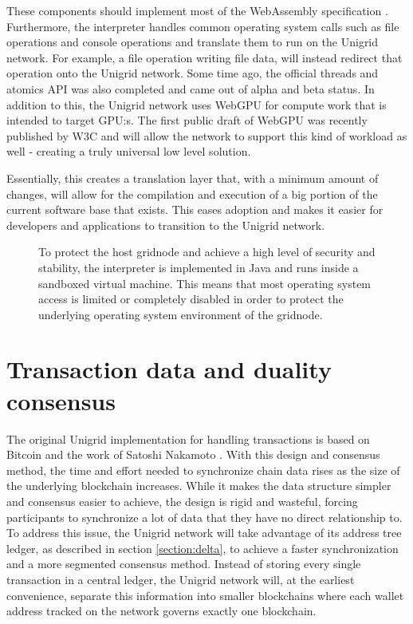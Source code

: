 \documentclass[10pt,a4paper,final]{article}
\begin{document}
These components should implement most of the WebAssembly specification \cite{webassembly}. Furthermore, the interpreter handles common operating system calls such as file operations and console operations and translate them to run on the Unigrid network. For example, a file operation writing file data, will instead redirect that operation onto the Unigrid network. Some time  ago, the official threads and atomics API \cite{webassemblythreads} was also completed and came out of alpha and beta status. In addition to this, the Unigrid network uses WebGPU for compute work that is intended to target GPU:s. The first public draft of WebGPU was recently published by W3C \cite{w3cwebgpu} and will allow the network to support this kind of workload as well - creating a truly universal low level solution.

Essentially, this creates a translation layer that, with a minimum amount of changes, will allow for the compilation and execution of a big portion of the current software base that exists. This eases adoption and makes it easier for developers and applications to transition to the Unigrid network.

\begin{figure}[H]
\centering
{}
\caption{To protect the host \gls{gridnode} and achieve a high level of security and stability, the interpreter is implemented in Java and runs inside a sandboxed virtual machine. This means that most operating system access is limited or completely disabled in order to protect the underlying operating system environment of the \gls{gridnode}.}
\end{figure}

\section{Transaction data and duality consensus}
The original Unigrid implementation for handling transactions is based on Bitcoin and the work of Satoshi Nakamoto \cite{bitcoin2008}. With this design and consensus method, the time and effort needed to synchronize chain data rises as the size of the underlying blockchain increases. While it makes the data structure simpler and consensus easier to achieve, the design is rigid and wasteful, forcing participants to synchronize a lot of data that they have no direct relationship to. To address this issue, the Unigrid network will take advantage of its address tree ledger, as described in section \ref{section:delta}, to achieve a faster synchronization and a more segmented consensus method. Instead of storing every single transaction in a central ledger, the Unigrid network will, at the earliest convenience, separate this information into smaller blockchains where each wallet address tracked on the network governs exactly one blockchain.
\end{document}
